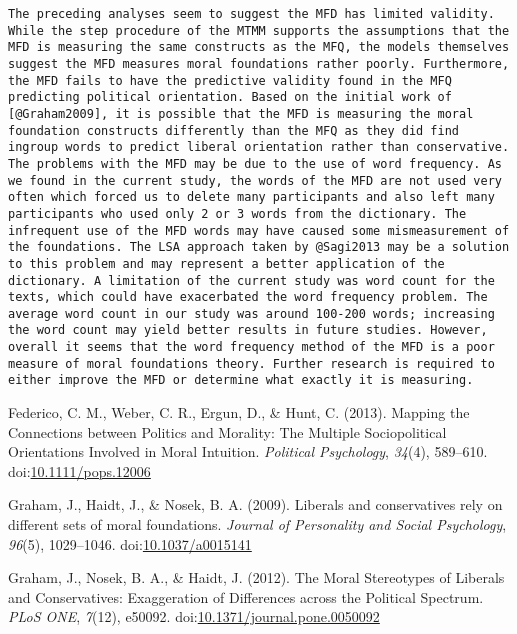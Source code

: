 \documentclass[english,man]{apa6}
\theoremstyle{definition}
\theoremstyle{definition}
\theoremstyle{definition}
\theoremstyle{remark}
\begin{document}
\begin{verbatim}
The preceding analyses seem to suggest the MFD has limited validity. While the step procedure of the MTMM supports the assumptions that the MFD is measuring the same constructs as the MFQ, the models themselves suggest the MFD measures moral foundations rather poorly. Furthermore, the MFD fails to have the predictive validity found in the MFQ predicting political orientation. Based on the initial work of [@Graham2009], it is possible that the MFD is measuring the moral foundation constructs differently than the MFQ as they did find ingroup words to predict liberal orientation rather than conservative. The problems with the MFD may be due to the use of word frequency. As we found in the current study, the words of the MFD are not used very often which forced us to delete many participants and also left many participants who used only 2 or 3 words from the dictionary. The infrequent use of the MFD words may have caused some mismeasurement of the foundations. The LSA approach taken by @Sagi2013 may be a solution to this problem and may represent a better application of the dictionary. A limitation of the current study was word count for the texts, which could have exacerbated the word frequency problem. The average word count in our study was around 100-200 words; increasing the word count may yield better results in future studies. However, overall it seems that the word frequency method of the MFD is a poor measure of moral foundations theory. Further research is required to either improve the MFD or determine what exactly it is measuring. 
\end{verbatim}

\hypertarget{refs}{}
\hypertarget{ref-Federico2013}{}
Federico, C. M., Weber, C. R., Ergun, D., \& Hunt, C. (2013). Mapping
the Connections between Politics and Morality: The Multiple
Sociopolitical Orientations Involved in Moral Intuition. \emph{Political
Psychology}, \emph{34}(4), 589--610.
doi:\href{https://doi.org/10.1111/pops.12006}{10.1111/pops.12006}

\hypertarget{ref-Graham2009}{}
Graham, J., Haidt, J., \& Nosek, B. A. (2009). Liberals and
conservatives rely on different sets of moral foundations. \emph{Journal
of Personality and Social Psychology}, \emph{96}(5), 1029--1046.
doi:\href{https://doi.org/10.1037/a0015141}{10.1037/a0015141}

\hypertarget{ref-Graham2012}{}
Graham, J., Nosek, B. A., \& Haidt, J. (2012). The Moral Stereotypes of
Liberals and Conservatives: Exaggeration of Differences across the
Political Spectrum. \emph{PLoS ONE}, \emph{7}(12), e50092.
doi:\href{https://doi.org/10.1371/journal.pone.0050092}{10.1371/journal.pone.0050092}
\end{document}
